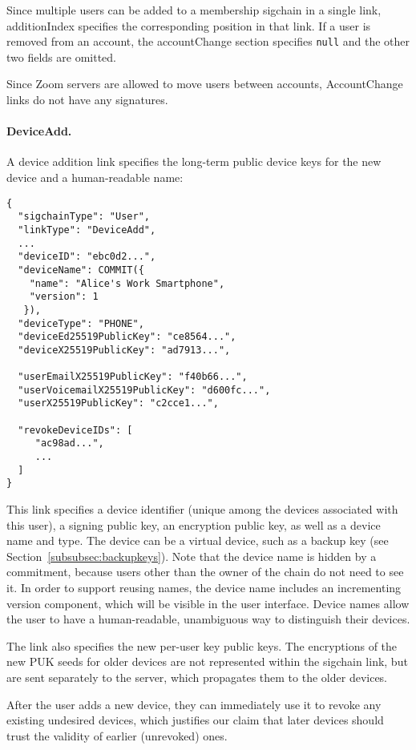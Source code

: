 Since multiple users can be added to a membership sigchain in a single link, \textsf{additionIndex}
specifies the corresponding position in that link. If a user is removed from an account, the
\textsf{accountChange} section specifies \accountID \texttt{null} and the other two fields are
omitted.

Since Zoom servers are allowed to move users between accounts, \textsf{AccountChange} links do not
have any signatures.

\paragraph{DeviceAdd.} A device addition link specifies the long-term public device keys for the new
device and a human-readable name:

\begin{Verbatim}
{
  "sigchainType": "User",
  "linkType": "DeviceAdd",
  ...
  "deviceID": "ebc0d2...",
  "deviceName": COMMIT({
    "name": "Alice's Work Smartphone",
    "version": 1
   }),
  "deviceType": "PHONE",
  "deviceEd25519PublicKey": "ce8564...",
  "deviceX25519PublicKey": "ad7913...",

  "userEmailX25519PublicKey": "f40b66...",
  "userVoicemailX25519PublicKey": "d600fc...",
  "userX25519PublicKey": "c2cce1...",

  "revokeDeviceIDs": [
     "ac98ad...",
     ...
  ]
}
\end{Verbatim}

This link specifies a device identifier (unique among the devices associated with this user), a
signing public key, an encryption public key, as well as a device name and type. The device can be a
virtual device, such as a backup key (see Section~\ref{subsubsec:backupkeys}).  Note that the device
name is hidden by a commitment, because users other than the owner of the chain do not need to see
it. In order to support reusing names, the device name includes an incrementing version component,
which will be visible in the user interface. Device names allow the user to have a human-readable,
unambiguous way to distinguish their devices.

The link also specifies the new per-user key public keys. The encryptions of the new PUK seeds for
older devices are not represented within the sigchain link, but are sent separately to the server,
which propagates them to the older devices.

After the user adds a new device, they can immediately use it to revoke any existing undesired
devices, which justifies our claim that later devices should trust the validity of earlier
(unrevoked) ones.

